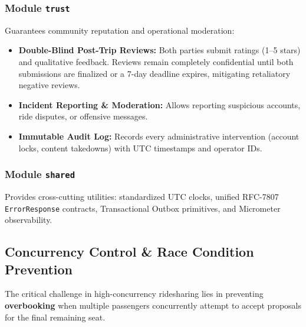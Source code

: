 \documentclass[conference,10pt,a4paper]{IEEEtran}
\begin{document}
\subsubsection{Module \texttt{trust}}
Guarantees community reputation and operational moderation:
\begin{itemize}
    \item \textbf{Double-Blind Post-Trip Reviews:} Both parties submit ratings (1--5 stars) and qualitative feedback. Reviews remain completely confidential until both submissions are finalized or a 7-day deadline expires, mitigating retaliatory negative reviews.
    \item \textbf{Incident Reporting \& Moderation:} Allows reporting suspicious accounts, ride disputes, or offensive messages.
    \item \textbf{Immutable Audit Log:} Records every administrative intervention (account locks, content takedowns) with UTC timestamps and operator IDs.
\end{itemize}

\subsubsection{Module \texttt{shared}}
Provides cross-cutting utilities: standardized UTC clocks, unified RFC-7807 \texttt{ErrorResponse} contracts, Transactional Outbox primitives, and Micrometer observability.

\subsection{Concurrency Control \& Race Condition Prevention}
The critical challenge in high-concurrency ridesharing lies in preventing \textbf{overbooking} when multiple passengers concurrently attempt to accept proposals for the final remaining seat.
\end{document}
